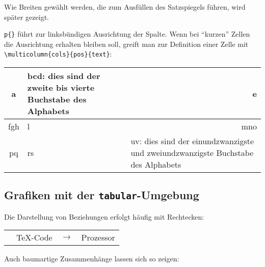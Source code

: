 \documentclass[ngerman,               %
               a4paper,               %
               fleqn,                 %
                     ]{scrartcl}       %
\begin{document}
Wie Breiten gewählt werden, die zum Ausfüllen des Satzspiegels führen, wird
später gezeigt.

\texttt{p\{\}} führt zur linksbündigen Ausrichtung der Spalte.
Wenn bei "`kurzen"' Zellen die Ausrichtung erhalten bleiben soll, greift
man zur Definition einer Zelle mit
\lstinline|\multicolumn{cols}{pos}{text}|:

\begin{tabular}{|c|p{4cm}|p{5cm}|}
  \hline
  a & bcd: dies sind der zweite bis vierte Buchstabe des Alphabets &
                                                                     \multicolumn{1}{r|}{e} \\
  \hline
  fgh & l & \multicolumn{1}{r|}{mno} \\
  \hline
  pq & rs & uv: dies sind der einundzwanzigste und zweiundzwanzigste
            Buchstabe des Alphabets \\
  \hline
\end{tabular}%

\subsection{Grafiken mit der \texttt{tabular}-Umgebung}

Die Darstellung von Beziehungen erfolgt häufig mit Rechtecken:


\begin{tabular}{p{1cm}|p{2cm}|p{1cm}|p{4cm}|}
  \cline{2-2}\cline{4-4}
  & \TeX-Code & \(\rightarrow\)& Prozessor \\
  \cline{2-2}\cline{4-4}
\end{tabular}

Auch baumartige Zusammenhänge lassen sich so zeigen:

\end{document}
